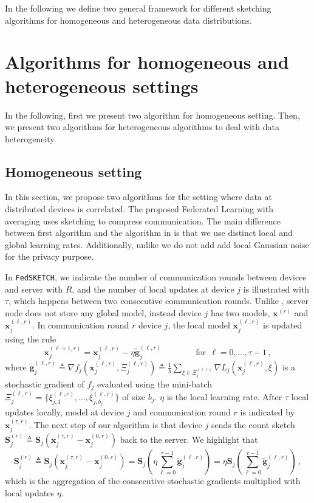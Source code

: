 In the following we define two general framework for different sketching algorithms for homogeneous and heterogeneous data distributions.

\section{Algorithms for homogeneous and heterogeneous settings}\label{sec:algos}
In the following, first we present two algorithm for homogeneous setting. Then, we present two algorithms for heterogeneous algorithms to deal with data heterogeneity.   

\subsection{Homogeneous setting}
In this section, we propose two algorithms for the setting where data at distributed devices is  correlated. The proposed Federated Learning with averaging uses sketching to compress communication. The main difference between first algorithm and the algorithm in \cite{li2019privacy} is that we use distinct local and global learning rates. Additionally, unlike \cite{li2019privacy} we do not add add local Gaussian noise for the privacy purpose. 

In \texttt{FedSKETCH}, we indicate the number of communication rounds between devices and server with $R$, and the number of local updates at device $j$ is illustrated with $\tau$, which happens between two consecutive communication rounds. Unlike \cite{haddadpour2020federated}, server node does not store any global model, instead device $j$ has two models, $\boldsymbol{x}^{(r)}$ and $\boldsymbol{x}^{(\ell,r)}_j$. In communication round $r$ device $j$, the local model $\boldsymbol{x}^{(\ell,r)}_j$ is updated using the rule $$\boldsymbol{x}_j^{(\ell+1,r)}=\boldsymbol{x}_j^{(\ell,r)}-\eta \tilde{\mathbf{g}}_j^{(\ell,r)} \qquad\qquad \text{for}\:\:\ell=0,\ldots,\tau-1\, ,$$
where $\tilde{\mathbf{g}}_j^{(\ell,r)}\triangleq\nabla{f}_j(\boldsymbol{x}_j^{(\ell,r)},\Xi_j^{(\ell,r)})\triangleq\frac{1}{b}\sum_{\xi\in\Xi_j^{(\ell,r)}}\nabla{L}_j(\boldsymbol{x}_j^{(\ell,r)},\xi)$ is a stochastic gradient of $f_j$ evaluated using the mini-batch $\Xi_j^{(\ell,r)}=\{\xi^{(\ell,r)}_{j,1},\ldots,\xi^{(\ell,r)}_{j,b_j} \}$ of size $b_j$. $\eta$ is the local learning rate. After $\tau$ local updates locally, model at device $j$ and communication round $r$ is indicated by $\boldsymbol{x}_j^{(\tau,r)}$. The next step of our algorithm is that device $j$ sends the count sketch $\mathbf{S}_j^{(r)}\triangleq\mathbf{S}_j\left(\boldsymbol{x}_j^{(\tau,r)}-\boldsymbol{x}_j^{(0,r)}\right)$ back to the server. We highlight that $$\mathbf{S}_j^{(r)}\triangleq\mathbf{S}_j\left(\boldsymbol{x}_j^{(\tau,r)}-\boldsymbol{x}_j^{(0,r)}\right)=\mathbf{S}_j\left(\eta\sum_{\ell=0}^{\tau-1}\tilde{\mathbf{g}}_j^{(\ell,r)}\right)=\eta\mathbf{S}_j\left(\sum_{\ell=0}^{\tau-1}\tilde{\mathbf{g}}_j^{(\ell,r)}\right)\, ,$$ which is the aggregation of the consecutive stochastic gradients multiplied with local updates $\eta$.

